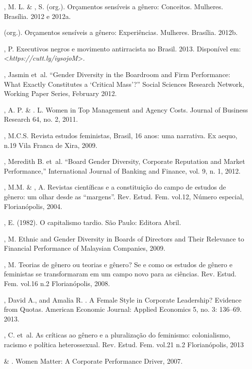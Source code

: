 \begin{bibliohedra}
, M. L. \& , S. (org.). Orçamentos sensíveis a gênero:
Conceitos.  Mulheres. Brasília. 2012 e 2012a.

\titidem \mbox{} (org.). Orçamentos sensíveis a gênero:
Experiências.  Mulheres. Brasília. 2012b.

, P. Executivos negros e movimento antirracista no Brasil. 2013.
Disponível em: \textless{}\emph{https://cutt.ly/iysojoM}\textgreater{}.

, Jasmin et~al. ``Gender Diversity in the Boardroom and Firm
Performance: What Exactly Constitutes a `Critical Mass'?'' Social
Sciences Research Network, Working Paper Series, February 2012.

, A. P. \& . L. Women in Top Management and Agency Costs.
Journal of Business Research 64, no. 2, 2011.

, M.C.S. Revista estudos feministas, Brasil, 16 anos: uma narrativa.
Ex aequo, n.19 Vila Franca de Xira, 2009.

, Meredith B. et~al. ``Board Gender Diversity, Corporate
Reputation and Market Performance,'' International Journal of Banking
and Finance, vol. 9, n. 1, 2012.

, M.M. \& , A. Revistas científicas e a constituição do
campo de estudos de gênero: um olhar desde as ``margens''. Rev. Estud.
Fem. vol.12, Número especial, Florianópolis, 2004.

, E. (1982). O capitalismo tardio. São Paulo: Editora Abril.

, M. Ethnic and Gender Diversity in Boards of Directors and
Their Relevance to Financial Performance of Malaysian Companies, 2009.

, M. Teorias de gênero ou teorias e gênero? Se e como os estudos de
gênero e feministas se transformaram em um campo novo para as ciências.
Rev. Estud. Fem. vol.16 n.2 Florianópolis, 2008.

, David A., and Amalia R. . A Female Style in Corporate
Leadership? Evidence from Quotas. American Economic Journal: Applied
Economics 5, no. 3: 136--69. 2013.

, C. et~al. As críticas ao gênero e a pluralização do feminismo:
colonialismo, racismo e política heterossexual. Rev. Estud. Fem. vol.21
n.2 Florianópolis, 2013

\mbox{} \& . Women Matter: A Corporate Performance Driver, 2007.


\end{bibliohedra}
